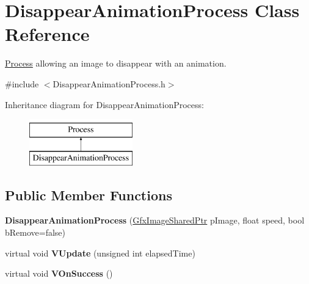 \hypertarget{classDisappearAnimationProcess}{\section{Disappear\-Animation\-Process Class Reference}
\label{classDisappearAnimationProcess}
}


\hyperlink{classProcess}{Process} allowing an image to disappear with an animation.  




{\ttfamily \#include $<$Disappear\-Animation\-Process.\-h$>$}

Inheritance diagram for Disappear\-Animation\-Process\-:\begin{figure}[H]
\begin{center}
\leavevmode
\includegraphics[height=2.000000cm]{classDisappearAnimationProcess}
\end{center}
\end{figure}
\subsection*{Public Member Functions}
\begin{DoxyCompactItemize}
\item 
\hypertarget{classDisappearAnimationProcess_abf254e926ed79b1bc08bb13f1af63b30}{{\bfseries Disappear\-Animation\-Process} (\hyperlink{GfxImage_8h_a42b2baf6110731a1a358d365e303e086}{Gfx\-Image\-Shared\-Ptr} p\-Image, float speed, bool b\-Remove=false)}\label{classDisappearAnimationProcess_abf254e926ed79b1bc08bb13f1af63b30}

\item 
\hypertarget{classDisappearAnimationProcess_a930a5f85afb13be8c43c94645056c475}{virtual void {\bfseries V\-Update} (unsigned int elapsed\-Time)}\label{classDisappearAnimationProcess_a930a5f85afb13be8c43c94645056c475}

\item 
\hypertarget{classDisappearAnimationProcess_afff67d347908bd3a4957e313299f8c57}{virtual void {\bfseries V\-On\-Success} ()}\label{classDisappearAnimationProcess_afff67d347908bd3a4957e313299f8c57}

\end{DoxyCompactItemize}
